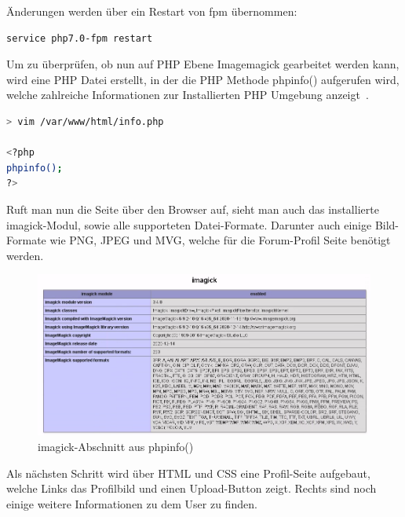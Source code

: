 Änderungen werden über ein Restart von fpm übernommen:
\begin{lstlisting}[language=Bash, caption=PHP-FPM Neustarten,label={lst:phpfpmrestart}]
service php7.0-fpm restart
\end{lstlisting}
\vspace{5mm}


Um zu überprüfen, ob nun auf PHP Ebene Imagemagick gearbeitet werden kann, wird eine PHP Datei erstellt, in der die PHP Methode phpinfo() aufgerufen wird, welche zahlreiche Informationen zur Installierten PHP Umgebung anzeigt~\cite{PHPPhpinfoManual}.

\begin{lstlisting}[language=Bash, caption=info.php mit phpinfo(),label={lst:phpinfo}]
> vim /var/www/html/info.php

<?php
phpinfo();
?>
\end{lstlisting}
\vspace{5mm}

Ruft man nun die Seite über den Browser auf, sieht man auch das installierte imagick-Modul, sowie alle supporteten Datei-Formate.
Darunter auch einige Bild-Formate wie PNG, JPEG und MVG, welche für die Forum-Profil Seite benötigt werden.

\begin{figure}[H]
    \includegraphics[width=1\textwidth]{img/phpinfo.png}
    \caption{imagick-Abschnitt aus phpinfo()}\label{fig:phpinfo}
\end{figure}


Als nächsten Schritt wird über HTML und CSS eine Profil-Seite aufgebaut, welche Links das Profilbild und einen Upload-Button zeigt.
Rechts sind noch einige weitere Informationen zu dem User zu finden.

